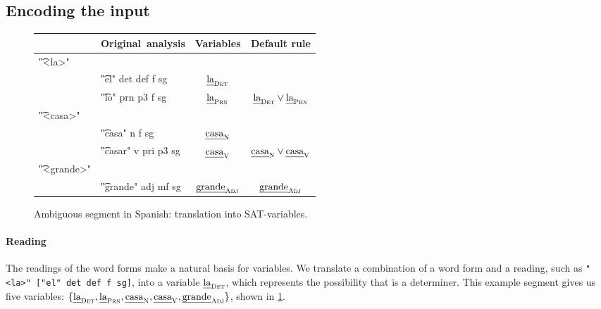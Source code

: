 \subsection{Encoding the input}


\begin{figure}[h]
\centering
\begin{tabular}{p{0.6cm} l | c | c }
   & \textbf{Original~analysis}
                & \textbf{Variables}
                              & \textbf{Default rule} \\ \hline
\t{"<la>"}   &   &            &  {\small {}} \\
  & \t{"el"
  det def f sg}  & $\text{\em la}_{\text{\sc Det}}$   &  \\
  & \t{"lo"
  prn p3 f sg}   & $\text{\em la}_{\text{\sc Prn}}$   &   $\text{\em la}_{\text{\sc Det}} \vee \text{\em la}_{\text{\sc Prn}}$ \\
\t{"<casa>"} &   &            &   \\
  & \t{"casa"
  n f sg}        & $\text{\em casa}_{\text{\sc N}}$   &  \\
  & \t{"casar"
   v pri p3 sg}  & $\text{\em casa}_{\text{\sc V}}$   & $\text{\em casa}_{\text{\sc N}} \vee \text{\em casa}_{\text{\sc V}}$  \\
\t{"<grande>"} & &            & \\
  & \t{"grande"
  adj mf sg}   & $\text{\em grande}_{\text{\sc Adj}}$ & $\text{\em grande}_{\text{\sc Adj}}$
\end{tabular}
\caption{Ambiguous segment in Spanish: translation into SAT-variables.}
\label{fig:laCasaGrande}
\end{figure}



\paragraph{Reading}
The readings of the word forms make a natural basis for variables.
We translate a combination of a word form and a reading, such as \texttt{"<la>" ["el" det def f sg]}, into a variable $\text{\em la}_{\text{\sc Det}}$, which represents the possibility that \la{} is a determiner. This example segment gives us five variables: $\{ \text{\em la}_{\text{\sc Det}} , \text{\em la}_{\text{\sc Prn}} , \text{\em casa}_{\text{\sc N}} , \text{\em casa}_{\text{\sc V}},  \text{\em grande}_{\text{\sc Adj}} \}$, shown in \ref{fig:laCasaGrande}.


